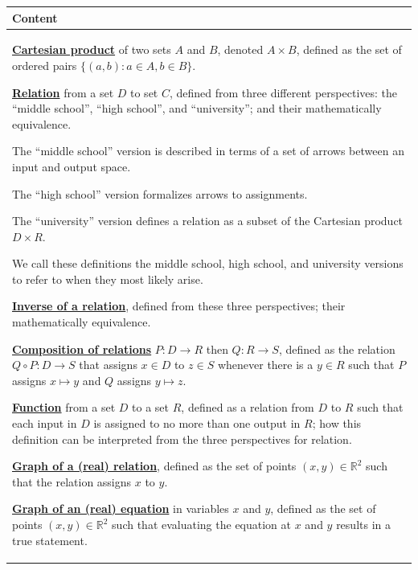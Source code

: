 \documentclass[11pt]{article}
\newcommand{\R}{\mathbb{R}}
\newcommand\st{:}
\renewcommand\emph[1]{\underline{\bf{#1}}} %
\theoremstyle{definition}
\begin{document}
\vspace*{-12pt}
\begin{tabular}{L{6.5in}} 
{\bf Content} \\ \hline \parskip4pt
\emph{Cartesian product} of two sets $A$ and $B$, denoted $A\times B$, defined as the set of ordered pairs $\{ (a,b) \st a\in A, b\in B \}$.

\emph{Relation} from a set $D$ to set $C$, defined from three different perspectives: the ``middle school'', ``high school'', and ``university''; and their mathematically equivalence. 
\begin{itemize*}
\item The ``middle school'' version is described in terms of a set of arrows between an input and output space.
\item The ``high school'' version formalizes arrows to assignments. 
\item The ``university'' version defines a relation as a subset of the Cartesian product $D\times R$. 
\end{itemize*}
We call these definitions the middle school, high school, and university versions to refer to when they most likely arise. 

\emph{Inverse of a relation}, defined from these three perspectives; their mathematically equivalence.

\emph{Composition of relations} $P:D\to R$ then $Q:R\to S$, defined as the relation $Q\circ P:D\to S$ that assigns $x\in D$ to $z\in S$ whenever there is a $y \in R$ such that $P$ assigns $x\mapsto y$ and $Q$ assigns $y\mapsto z$.

\emph{Function} from a set $D$ to a set $R$, defined as a relation from $D$ to $R$ such that each input in $D$ is assigned to no more than one output in $R$; how this definition can be interpreted from the three perspectives for relation.

\emph{Graph of a (real) relation}, defined as the set of points $(x,y)\in \R^2$ such that the relation assigns $x$ to $y$.

\emph{Graph of an (real) equation} in variables $x$ and $y$, defined as the set of points $(x,y)\in \R^2$ such that evaluating the equation at $x$ and $y$ results in a true statement.
\end{tabular} 
\end{document}
